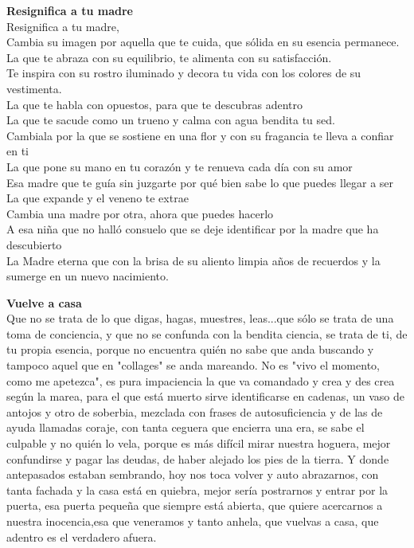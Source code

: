 \documentclass[12pt, a4paper, twoside]{book} %
\begin{document}
\noindent\textbf{Resignifica a tu madre}\\
Resignifica a tu madre,\\
Cambia su imagen por aquella que te cuida, que sólida en su esencia permanece.\\
La que te abraza con su equilibrio, te alimenta con su satisfacción.\\
Te inspira con su rostro iluminado y decora tu vida con los colores de su vestimenta.\\
La que te habla con opuestos, para que te descubras adentro\\
La que te sacude como un trueno y calma con agua bendita tu sed.\\
Cambiala por la que se sostiene en una flor y con su fragancia te lleva a confiar en ti\\
La que pone su mano en tu corazón y te renueva cada día con su amor\\
Esa madre que te guía sin juzgarte por qué bien sabe lo que puedes llegar a ser\\
La que expande y el veneno te extrae\\
Cambia una madre por otra, ahora que puedes hacerlo\\
A esa niña que no halló consuelo que se deje identificar por la madre que ha descubierto\\
La Madre eterna que con la brisa de su aliento limpia años de recuerdos y la sumerge en un nuevo nacimiento.\\

\clearpage

\noindent\textbf{Vuelve a casa}\\
Que no se trata de lo que digas, hagas, muestres, leas...que sólo se trata de una toma de conciencia, y que no se confunda con la bendita ciencia, se trata de ti, de tu propia esencia, porque no encuentra quién no sabe que anda buscando y tampoco aquel que en "collages" se anda mareando. No es "vivo el momento, como me apetezca", es pura impaciencia la que va comandado y crea y des crea según la marea, para el que está muerto sirve identificarse en cadenas, un vaso de antojos y otro de soberbia, mezclada con frases de autosuficiencia y de las de ayuda llamadas coraje, con tanta ceguera que encierra una era, se sabe el culpable y no quién lo vela, porque es más difícil mirar nuestra hoguera, mejor confundirse y pagar las deudas, de haber alejado los pies de la tierra. Y  donde antepasados estaban sembrando, hoy nos toca volver y auto abrazarnos, con tanta fachada y la casa está en quiebra, mejor sería  postrarnos y entrar por la puerta, esa puerta pequeña que siempre está abierta, que quiere acercarnos a nuestra inocencia,esa que veneramos y tanto anhela, que vuelvas a casa, que adentro es el verdadero afuera.
\end{document}
